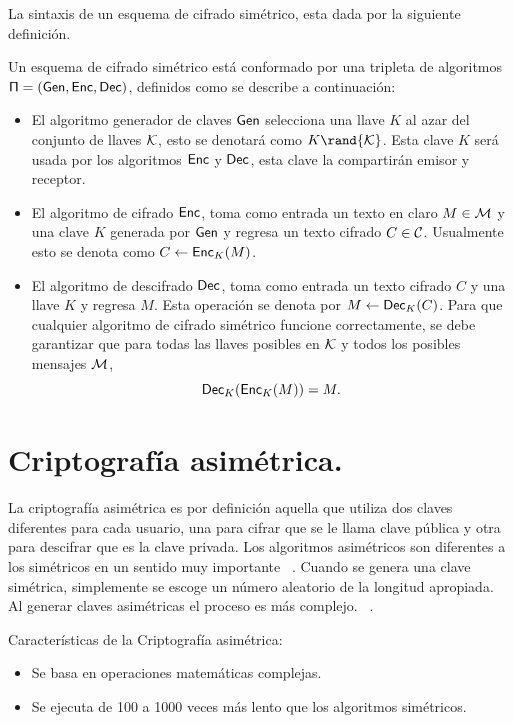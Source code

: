 La sintaxis de un esquema de cifrado simétrico, esta dada por la siguiente definición.
\begin{definition} 
Un esquema de cifrado simétrico está conformado por una tripleta de algoritmos 
$\sf \Pi=(Gen, Enc, Dec)$, definidos como se describe a continuación:
\begin{itemize}
\item  El algoritmo generador de claves $\sf Gen$ selecciona una llave  $K$ al azar del conjunto de llaves $\cal K$, esto se denotará como $K \rand {\cal K}$.
Esta clave $K$  será usada por los algoritmos  $\sf Enc$ y $\sf Dec$, esta clave la compartirán  emisor y receptor. 
\item El algoritmo de cifrado $\sf Enc$, toma como entrada un texto en claro  $M \in {\cal M}$ y una clave $K$ generada por  $\sf Gen$  y regresa un texto cifrado $C \in {\cal C}$.  Usualmente esto se denota como $C \leftarrow {\sf Enc}_K(M)$.
 \item El algoritmo de descifrado $\sf Dec$, toma como entrada un texto cifrado $C$ y una llave $K$ y regresa $M$. Esta operación se denota por  $M \leftarrow {\sf Dec}_K(C)$.
Para que cualquier algoritmo de cifrado simétrico funcione correctamente, se debe garantizar que para
todas las llaves posibles en  $\cal K$ y todos los posibles mensajes $\cal M$, $$ {\sf Dec}_K({\sf Enc}_K(M)) = M.$$
\end{itemize}
\end{definition}

\section{Criptografía asimétrica. }
La criptografía asimétrica es por definición aquella que utiliza dos claves diferentes para cada usuario, una para cifrar que se le llama clave pública y otra para descifrar que es la clave privada. Los algoritmos asimétricos son diferentes a los simétricos en un sentido muy importante ~\cite{sime}. Cuando se genera una clave simétrica, simplemente se escoge un número aleatorio de la longitud apropiada. Al generar claves asimétricas el proceso es más complejo. ~\cite{sime}.

\bigskip Características de la Criptografía asimétrica: \begin{itemize}
	\item Se basa en operaciones matemáticas complejas.
	\item Se ejecuta de 100 a 1000 veces más lento que los algoritmos simétricos.
\end{itemize} ~\cite{sime} \\ \\ 

